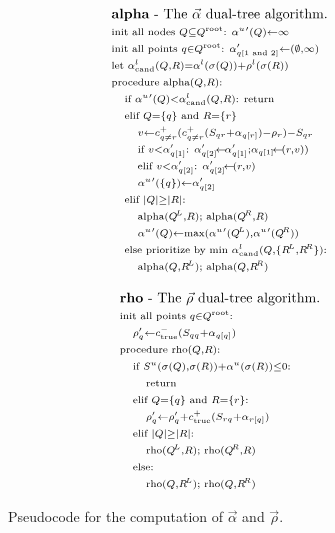\documentclass{article}
\newcommand{\kdroot}[1]{#1^{\text{\rm root}}}
\newcommand{\kdleft}[1]{#1^{\!L}}
\newcommand{\kdright}[1]{#1^{\!R}}
\newcommand{\X}{\\ \scriptstyle}
\newcommand{\x}{\\ \hspace{0.13in} \scriptstyle}
\newcommand{\xx}{\\ \hspace{0.26in} \scriptstyle}
\newcommand{\true}{\text{true}}
\newcommand{\ocpos}[1]{c^{+}_{#1}}
\newcommand{\ocneg}[1]{c^{-}_{#1}}
\newcommand{\cpos}[2]{\ocpos{#1 \neq #2}}
\newcommand{\simil}[2]{S_{#1#2}}
\newcommand{\vecrho}{\vec{\rho}}
\newcommand{\vecalpha}{\vec{\alpha}}
\newcommand{\frho}[1]{\rho_{#1}}
\newcommand{\falphaj}[2]{\alpha_{#1[#2]}}
\newcommand{\falphamax}{\alpha^{u}}
\newcommand{\falphamin}{\alpha^{l}}
\newcommand{\frhomin}{\rho^{l}}
\newcommand{\alphacand}{v}
\begin{document}
\begin{figure}
  \begin{minipage}{2.8in}
    \begin{equation*}
      \begin{array}{l}
        \text{{\bf alpha} - The }\vecalpha\text{ dual-tree algorithm.}
        \X \text{init all nodes }Q \subseteq \kdroot{Q}\text{: }\falphamax{'}(Q) \gets \infty
        \X \text{init all points }q \in \kdroot{Q}\text{: }\falphaj{q}{1\text{ and }2}' \gets (\emptyset, \infty)
        \X \text{let }\falphamin_{\text{cand}}(Q, R) = \falphamin(\sigma(Q)) + \frhomin(\sigma(R))
        \X \text{procedure alpha}(Q,R)\text{:}
        \x \text{if }\falphamax{'}(Q) < \falphamin_{\text{cand}}(Q, R)\text{: return}
        \x \text{elif }Q = \{q\} \text{ and } R = \{r\}
        \xx \alphacand \gets \cpos{q}{r}(\cpos{q}{r}(\simil{q}{r} + \falphaj{q}{r}) - \frho{r}) - \simil{q}{r}
        \xx \text{if }\alphacand < \falphaj{q}{1}'\text{: } \falphaj{q}{2}' \!\gets\! \falphaj{q}{1}'; \falphaj{q}{1} \!\gets\! (r, \alphacand))
        \xx \text{elif }\alphacand < \falphaj{q}{2}'\text{: } \falphaj{q}{2}' \!\gets\! (r, \alphacand)
        \xx \falphamax{'}(\{q\}) \gets \falphaj{q}{2}'
        \x \text{elif }|Q| \geq |R|\text{:}
        \xx \text{alpha}(\kdleft{Q}, R); \text{ alpha}(\kdright{Q}, R)
        \xx \falphamax{'}(Q) \gets \max(\falphamax{'}(\kdleft{Q}), \falphamax{'}(\kdright{Q}))
        \x \text{else prioritize by min }\falphamin_{\text{cand}}(Q,\{\kdleft{R}, \kdright{R}\}){:}
        \xx \text{alpha}(Q, \kdleft{R}); \text{ alpha}(Q, \kdright{R})
      \end{array}
    \end{equation*}
  \end{minipage}
  \begin{minipage}{2.5in}
    \begin{equation*}
      \begin{array}{l}
        \text{{\bf rho} - The }\vecrho\text{ dual-tree algorithm.}
        \X \text{init all points }q \in \kdroot{Q}\text{: }
        \x \frho{q}'\gets \ocneg{\true}(\simil{q}{q} + \falphaj{q}{q})
        \X \text{procedure rho}(Q,R)\text{:}
        \x \text{if }S^u(\sigma(Q),\sigma(R)) + \falphamax(\sigma(R)) \leq 0\text{:}
        \xx \text{return}
        \x \text{elif }Q = \{q\} \text{ and } R = \{r\}\text{:}
        \xx \frho{q}' \gets \frho{q}' + \ocpos{\true}(\simil{r}{q} + \falphaj{r}{q})
        \x \text{elif }|Q| \geq |R|\text{:}
        \xx \text{rho}(\kdleft{Q}, R); \text{ rho}(\kdright{Q}, R)
        \x \text{else:}
        \xx \text{rho}(Q, \kdleft{R}); \text{ rho}(Q, \kdright{R})
      \end{array}
    \end{equation*}
    \caption{\label{fig:alpharho}\footnotesize Pseudocode for the computation of
      $\vecalpha$ and $\vecrho$.}
  \end{minipage}
\end{figure}
\end{document}
